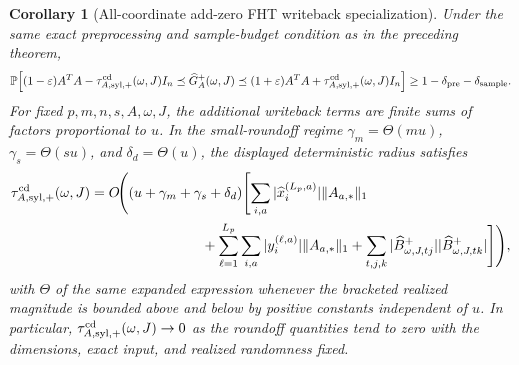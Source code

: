 \documentclass[11pt]{article}
\newcommand{\Prob}{\mathbb{P}}
\newcommand{\I}{I}
\newcommand{\eps}{\varepsilon}
\newtheorem{corollary}[theorem]{Corollary}
\theoremstyle{remark}
\begin{document}
\begin{corollary}[All-coordinate add-zero FHT writeback specialization]
Under the same exact preprocessing and sample-budget condition as in the
preceding theorem,
\[
  \Prob\!\left[
    (1-\eps)A^TA-\tau_{A,{\rm syl},+}^{\rm cd}(\omega,J)\I_n
    \preceq
    \widehat G_A^+(\omega,J)
    \preceq
    (1+\eps)A^TA+\tau_{A,{\rm syl},+}^{\rm cd}(\omega,J)\I_n
  \right]
  \ge
  1-\delta_{\rm pre}-\delta_{\rm sample}.
\]
For fixed \(p,m,n,s,A,\omega,J\), the additional writeback terms are finite
sums of factors proportional to \(u\).  In the small-roundoff regime
\(\gamma_m=\Theta(mu)\), \(\gamma_s=\Theta(su)\), and
\(\delta_d=\Theta(u)\), the displayed deterministic radius satisfies
\begin{align*}
  \tau_{A,{\rm syl},+}^{\rm cd}(\omega,J)
  &=
  O\!\Biggl(
    (u+\gamma_m+\gamma_s+\delta_d)
    \Biggl[
      \sum_{i,a}|\widehat x_i^{(L_p,a)}|\|A_{a,*}\|_1 \\
  &\hspace{2.8cm}
      +
      \sum_{\ell=1}^{L_p}\sum_{i,a}
        |y_i^{(\ell,a)}|\|A_{a,*}\|_1
      +
      \sum_{t,j,k}
        |\widehat B^+_{\omega,J,tj}|
        |\widehat B^+_{\omega,J,tk}|
    \Biggr]
  \Biggr),
\end{align*}
with \(\Theta\) of the same expanded expression whenever the bracketed
realized magnitude is bounded above and below by positive constants independent
of \(u\).  In particular,
\(\tau_{A,{\rm syl},+}^{\rm cd}(\omega,J)\to0\) as the roundoff quantities
tend to zero with the dimensions, exact input, and realized randomness fixed.
\end{corollary}
\end{document}
